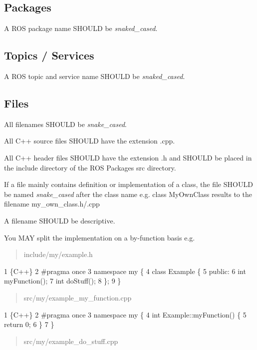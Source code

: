 \subsection*{Packages}

A R\+OS package name S\+H\+O\+U\+LD be {\itshape snaked\+\_\+cased}.

\subsection*{Topics / Services}

A R\+OS topic and service name S\+H\+O\+U\+LD be {\itshape snaked\+\_\+cased}.

\subsection*{Files}

All filenames S\+H\+O\+U\+LD be {\itshape snake\+\_\+cased}.

All C++ source files S\+H\+O\+U\+LD have the extension {\ttfamily .cpp}.

All C++ header files S\+H\+O\+U\+LD have the extension {\ttfamily .h} and S\+H\+O\+U\+LD be placed in the {\ttfamily include} directory of the R\+OS Packages {\ttfamily src} directory.

If a file mainly contains definition or implementation of a class, the file S\+H\+O\+U\+LD be named {\itshape snake\+\_\+cased} after the class name e.\+g. {\ttfamily class My\+Own\+Class} results to the filename {\ttfamily my\+\_\+own\+\_\+class.\+h/.cpp}

A filename S\+H\+O\+U\+LD be descriptive.

You M\+AY split the implementation on a by-\/function basis e.\+g. \begin{quote}
include/my/example.\+h \end{quote}



\begin{DoxyCode}
1 \{C++\}
2 #pragma once
3 namespace my \{
4     class Example \{
5         public:
6         int myFunction();
7         int doStuff();
8     \};
9 \}
\end{DoxyCode}
 \begin{quote}
src/my/example\+\_\+my\+\_\+function.\+cpp \end{quote}



\begin{DoxyCode}
1 \{C++\}
2 #pragma once
3 namespace my \{
4     int Example::myFunction() \{
5         return 0;
6     \}
7 \}
\end{DoxyCode}
 \begin{quote}
src/my/example\+\_\+do\+\_\+stuff.\+cpp \end{quote}



